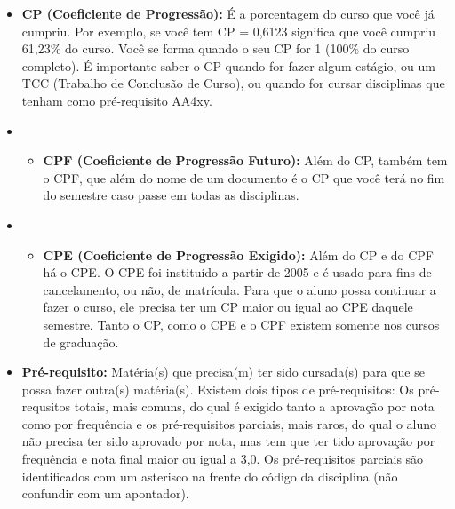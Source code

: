 \begin{itemize}
\item  \textbf{CP (Coeficiente de Progressão):} É a porcentagem do curso que você já cumpriu. Por exemplo, se você tem CP = 0,6123 significa que você cumpriu 61,23\% do curso. Você se forma quando o seu CP for 1 (100\% do curso completo). É importante saber o CP quando for fazer algum estágio, ou um TCC (Trabalho de Conclusão de Curso), ou quando for cursar disciplinas que tenham como pré-requisito AA4xy.
\end{itemize}

\begin{itemize}
\item \begin{itemize}
\item  \textbf{CPF (Coeficiente de Progressão Futuro):} Além do CP, também tem o CPF, que além do nome de um documento é o CP que você terá no fim do semestre caso passe em todas as disciplinas.
\end{itemize}
\end{itemize}

\begin{itemize}
\item \begin{itemize}
\item  \textbf{CPE (Coeficiente de Progressão Exigido):} Além do CP e do CPF há o CPE. O CPE foi instituído a partir de 2005 e é usado para fins de cancelamento, ou não, de matrícula. Para que o aluno possa continuar a fazer o curso, ele precisa ter um CP maior ou igual ao CPE daquele semestre. Tanto o CP, como o CPE e o CPF existem somente nos cursos de graduação.
\end{itemize}
\end{itemize}

\begin{itemize}
\item  \textbf{Pré-requisito:} Matéria(s) que precisa(m) ter sido cursada(s) para que se possa fazer outra(s) matéria(s). Existem dois tipos de pré-requisitos: Os pré-requsitos totais, mais comuns, do qual é exigido tanto a aprovação por nota como por frequência e os pré-requisitos parciais, mais raros, do qual o aluno não precisa ter sido aprovado por nota, mas tem que ter tido aprovação por frequência e nota final maior ou igual a 3,0. Os pré-requisitos parciais são identificados com um asterisco na frente do código da disciplina (não confundir com um apontador).
\end{itemize}

